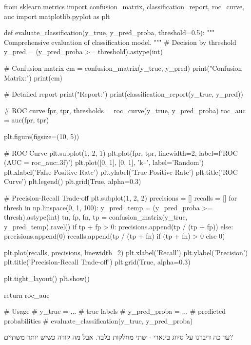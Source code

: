 \begin{pythonbox}
from sklearn.metrics import confusion_matrix, classification_report, roc_curve, auc
import matplotlib.pyplot as plt

def evaluate_classification(y_true, y_pred_proba, threshold=0.5):
    """
    Comprehensive evaluation of classification model.
    """
    # Decision by threshold
    y_pred = (y_pred_proba >= threshold).astype(int)

    # Confusion matrix
    cm = confusion_matrix(y_true, y_pred)
    print("Confusion Matrix:")
    print(cm)

    # Detailed report
    print("\nClassification Report:")
    print(classification_report(y_true, y_pred))

    # ROC curve
    fpr, tpr, thresholds = roc_curve(y_true, y_pred_proba)
    roc_auc = auc(fpr, tpr)
    
    plt.figure(figsize=(10, 5))
    
    # ROC Curve
    plt.subplot(1, 2, 1)
    plt.plot(fpr, tpr, linewidth=2, label=f'ROC (AUC = {roc_auc:.3f})')
    plt.plot([0, 1], [0, 1], 'k--', label='Random')
    plt.xlabel('False Positive Rate')
    plt.ylabel('True Positive Rate')
    plt.title('ROC Curve')
    plt.legend()
    plt.grid(True, alpha=0.3)
    
    # Precision-Recall Trade-off
    plt.subplot(1, 2, 2)
    precisions = []
    recalls = []
    for thresh in np.linspace(0, 1, 100):
        y_pred_temp = (y_pred_proba >= thresh).astype(int)
        tn, fp, fn, tp = confusion_matrix(y_true, y_pred_temp).ravel()
        if tp + fp > 0:
            precisions.append(tp / (tp + fp))
        else:
            precisions.append(0)
        recalls.append(tp / (tp + fn) if (tp + fn) > 0 else 0)
    
    plt.plot(recalls, precisions, linewidth=2)
    plt.xlabel('Recall')
    plt.ylabel('Precision')
    plt.title('Precision-Recall Trade-off')
    plt.grid(True, alpha=0.3)
    
    plt.tight_layout()
    plt.show()
    
    return roc_auc

# Usage
# y_true = ...  # true labels
# y_pred_proba = ...  # predicted probabilities
# evaluate_classification(y_true, y_pred_proba)
\end{pythonbox}


עד כה דיברנו על סיווג בינארי - שתי מחלקות בלבד. אבל מה קורה כשיש יותר משתיים?

